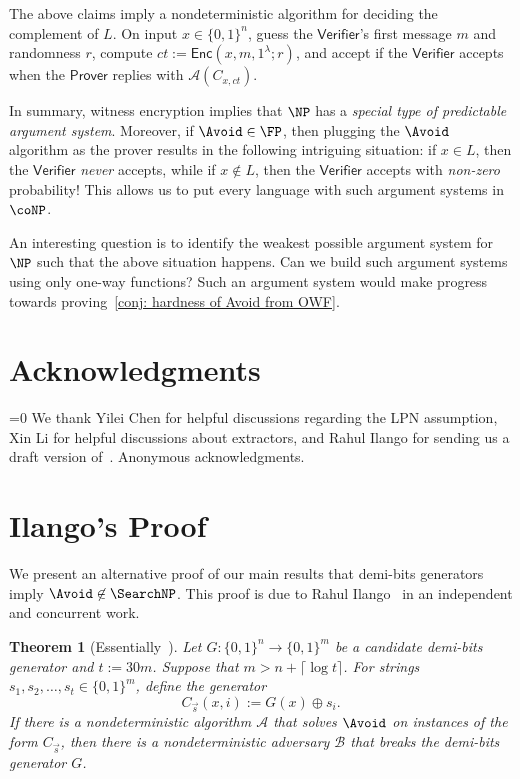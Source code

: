 \documentclass[10pt,a4paper]{article}
\newtheorem{theorem}{Theorem}[section]
\theoremstyle{definition}
\theoremstyle{remark}
\newcommand{\Enc}{\mathsf{Enc}}
\newcommand{\calA}{\mathcal{A}}
\newcommand{\calB}{\mathcal{B}}
\newcommand{\Prover}{\mathsf{Prover}}
\newcommand{\Verifier}{\mathsf{Verifier}}
\def\Anonymity{0}
\begin{document}
The above claims imply a nondeterministic algorithm for deciding the complement of $L$. On input $x \in \{0, 1\}^n$, guess the $\Verifier$'s first message $m$ and randomness $r$, compute $ct := \Enc(x, m, 1^\lambda; r)$, and accept if the $\Verifier$ accepts when the $\Prover$ replies with $\calA(C_{x, ct})$.

In summary, witness encryption implies that $\NP$ has a \emph{special type of predictable argument system}. Moreover, if $\Avoid \in \FP$, then plugging the $\Avoid$ algorithm as the prover results in the following intriguing situation: if $x\in L$, then the $\Verifier$ \emph{never} accepts, while if $x\not\in L$, then the $\Verifier$ accepts with \emph{non-zero} probability! This allows us to put every language with such argument systems in $\coNP$.

An interesting question is to identify the weakest possible argument system for $\NP$ such that the above situation happens. Can we build such argument systems using only one-way functions? Such an argument system would make progress towards proving~\autoref{conj: hardness of Avoid from OWF}.







\section*{Acknowledgments}
\ifnum\Anonymity=0
We thank Yilei Chen for helpful discussions regarding the LPN assumption, Xin Li for helpful discussions about extractors, and Rahul Ilango for sending us a draft version of~\cite{Ilango25}.
\else
Anonymous acknowledgments.
\fi



\appendix

\section{Ilango's Proof}\label{sec: RAHUL}
We present an alternative proof of our main results that demi-bits generators imply $\Avoid\not\in\SearchNP$. This proof is due to Rahul Ilango~\cite{Ilango25} in an independent and concurrent work.


\begin{theorem}[{Essentially~\cite{Ilango25}}]\label{thm: Ilango25}
    Let $G: \{0, 1\}^n \to \{0, 1\}^m$ be a candidate demi-bits generator and $t := 30m$. Suppose that $m > n + \lceil \log t\rceil$. For strings $s_1, s_2, \dots, s_t\in \{0, 1\}^m$, define the generator
    \[C_{\vec{s}}(x, i) := G(x) \oplus s_i.\]
    If there is a nondeterministic algorithm $\calA$ that solves $\Avoid$ on instances of the form $C_{\vec{s}}$, then there is a nondeterministic adversary $\calB$ that breaks the demi-bits generator $G$.
\end{theorem}
\end{document}
